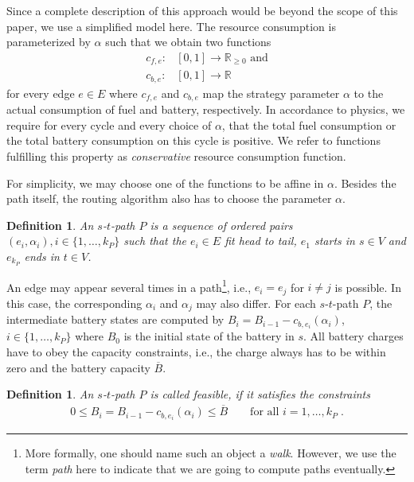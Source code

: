 \documentclass[a4paper]{scrartcl}
\newcommand{\R}{\mathbb{R}}
\renewcommand{\bar}[1]{\overline{#1}}
\newtheorem{definition}[theorem]{Definition}
\begin{document}
Since a complete description of this approach would be beyond the scope of this paper, we use a simplified model here. The resource consumption is parameterized by $\alpha$ such that we obtain two functions
\begin{align}
c_{f,e}:&[0,1]  \to \R_{\ge 0}\mbox{ and}\\
c_{b,e}:&[0,1]  \to \R
\end{align}
for every edge $e\in E$ where $c_{f,e}$ and $c_{b,e}$ map the strategy parameter $\alpha$ to the actual consumption of fuel and battery, respectively. In accordance to physics, we require for every cycle and every choice of $\alpha$, that the total fuel consumption or the total battery consumption on this cycle is positive. We refer to functions fulfilling this property as \emph{conservative} resource consumption function.

For simplicity, we may choose one of the functions to be affine in $\alpha$. Besides the path itself, the routing algorithm also has to choose the parameter $\alpha$.

\begin{definition}
 An $s$-$t$-\emph{path} $P$ is a sequence of ordered pairs $(e_i,\alpha_{i}), i\in\{1,\dots,k_P\}$ such that the $e_i\in E$ fit head to tail, $e_1$ starts in $s\in V$ and $e_{k_P}$ ends in $t\in V$. 
\end{definition}

An edge may appear several times in a path\footnote{More formally, one should name such an object a \emph{walk}. However, we use the term \emph{path} here to indicate that we are going to compute paths eventually.}, i.e., $e_i=e_j$ for $i\not=j$ is possible. In this case, the corresponding $\alpha_{i}$ and $\alpha_{j}$ may also differ. For each $s$-$t$-path $P$, the intermediate battery states are computed by $B_i=B_{i-1}-c_{b,e_i}(\alpha_{i})$, $i\in\{1,\dots,k_P\}$ where $B_0$ is the initial state of the battery in $s$. All battery charges have to obey the capacity constraints, i.e., the charge always has to be within zero and the battery capacity $\overline{B}$.

\begin{definition}
An $s$-$t$-path $P$ is called \emph{feasible}, if it satisfies the constraints
\begin{align}
0\le B_i =  B_{i-1}-c_{b,e_i}(\alpha_{i}) \le\bar{B} \label{eq:constrained-1} \qquad \text{for all } i=1,\ldots,k_P\;.
\end{align}
\end{definition}
\end{document}
